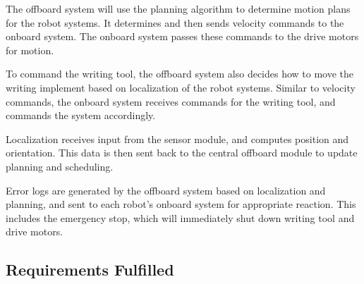 The offboard system will use the planning algorithm to determine motion plans for the robot systems. It determines and then sends velocity commands to the onboard system. The onboard system passes these commands to the drive motors for motion.

To command the writing tool, the offboard system also decides how to move the writing implement based on localization of the robot systems. Similar to velocity commands, the onboard system receives commands for the writing tool, and commands the system accordingly.

Localization receives input from the sensor module, and computes position and orientation. This data is then sent back to the central offboard module to update planning and scheduling.

Error logs are generated by the offboard system based on localization and planning, and sent to each robot's onboard system for appropriate reaction. This includes the emergency stop, which will immediately shut down writing tool and drive motors.

\subsection{Requirements Fulfilled}

